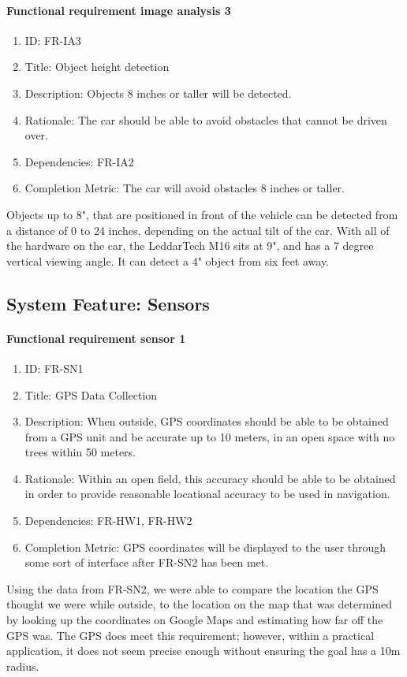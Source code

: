 \documentclass[compsoc,draftclsnofoot,onecolumn,10pt]{IEEEtran}
\begin{document}
	\paragraph{\textbf{Functional requirement image analysis 3}}
		\begin{enumerate}
			\item ID: FR-IA3
			\item Title: Object height detection
			\item Description: Objects 8 inches or taller will be detected.
			\item Rationale: The car should be able to avoid obstacles that cannot be driven over.
			\item Dependencies: FR-IA2
			\item Completion Metric: The car will avoid obstacles 8 inches or taller.
		\end{enumerate}
		Objects up to 8", that are positioned in front of the vehicle can be detected from a distance of 0 to 24 inches, depending on the actual tilt of the car. With all of the hardware on the car, the LeddarTech M16 sits at 9", and has a 7 degree vertical viewing angle. It can detect a 4" object from six feet away.

\subsection{System Feature: Sensors}

	\paragraph{\textbf{Functional requirement sensor 1}}
    		\begin{enumerate}
    			\item ID: FR-SN1
    			\item Title: GPS Data Collection
    			\item Description: When outside, GPS coordinates should be able to be obtained from a GPS unit and be accurate up to 10 meters, in an open space with no trees within 50 meters. 
    			\item Rationale: Within an open field, this accuracy should be able to be obtained in order to provide reasonable locational accuracy to be used in navigation.
    			\item Dependencies: FR-HW1, FR-HW2
			\item Completion Metric: GPS coordinates will be displayed to the user through some sort of interface after FR-SN2 has been met. 
    		\end{enumerate}
	Using the data from FR-SN2, we were able to compare the location the GPS thought we were while outside, to the location on the map that was determined by looking up the coordinates on Google Maps and estimating how far off the GPS was. The GPS does meet this requirement; however, within a practical application, it does not seem precise enough without ensuring the goal has a 10m radius. 
	
\end{document}
